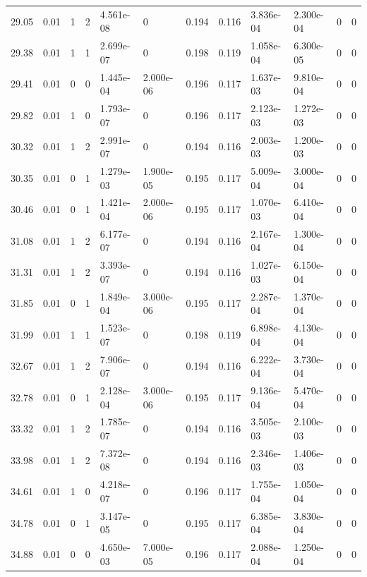 \documentclass[preview]{standalone}
\begin{document}
{{{\begin{tabular}{L{1.2cm}C{1.2cm} C{0.3cm}C{0.5cm} C{1.4cm}C{1.4cm} C{1.4cm}C{1.4cm} C{1.6cm}C{1.6cm} C{1.6cm}C{1.6cm}}
  29.05  &  0.01  & 1     &  2 &  4.561e-08  & 0  &  0.194&   0.116& 3.836e-04 & 2.300e-04   &  0 & 0  \\ 
  29.38  &  0.01  & 1     &  1 &  2.699e-07  & 0  &  0.198&   0.119& 1.058e-04 & 6.300e-05   &  0 & 0  \\ 
  29.41  &  0.01  & 0     &  0 &  1.445e-04  & 2.000e-06  &  0.196&   0.117& 1.637e-03 & 9.810e-04   &  0 & 0  \\ 
  29.82  &  0.01  & 1     &  0 &  1.793e-07  & 0  &  0.196&   0.117& 2.123e-03 & 1.272e-03   &  0 & 0  \\ 
  30.32  &  0.01  & 1     &  2 &  2.991e-07  & 0  &  0.194&   0.116& 2.003e-03 & 1.200e-03   &  0 & 0  \\ 
  30.35  &  0.01  & 0     &  1 &  1.279e-03  & 1.900e-05  &  0.195&   0.117& 5.009e-04 & 3.000e-04   &  0 & 0  \\ 
  30.46  &  0.01  & 0     &  1 &  1.421e-04  & 2.000e-06  &  0.195&   0.117& 1.070e-03 & 6.410e-04   &  0 & 0  \\ 
  31.08  &  0.01  & 1     &  2 &  6.177e-07  & 0  &  0.194&   0.116& 2.167e-04 & 1.300e-04   &  0 & 0  \\ 
  31.31  &  0.01  & 1     &  2 &  3.393e-07  & 0  &  0.194&   0.116& 1.027e-03 & 6.150e-04   &  0 & 0  \\ 
  31.85  &  0.01  & 0     &  1 &  1.849e-04  & 3.000e-06  &  0.195&   0.117& 2.287e-04 & 1.370e-04   &  0 & 0  \\ 
  31.99  &  0.01  & 1     &  1 &  1.523e-07  & 0  &  0.198&   0.119& 6.898e-04 & 4.130e-04   &  0 & 0  \\ 
  32.67  &  0.01  & 1     &  2 &  7.906e-07  & 0  &  0.194&   0.116& 6.222e-04 & 3.730e-04   &  0 & 0  \\ 
  32.78  &  0.01  & 0     &  1 &  2.128e-04  & 3.000e-06  &  0.195&   0.117& 9.136e-04 & 5.470e-04   &  0 & 0  \\ 
  33.32  &  0.01  & 1     &  2 &  1.785e-07  & 0  &  0.194&   0.116& 3.505e-03 & 2.100e-03   &  0 & 0  \\ 
  33.98  &  0.01  & 1     &  2 &  7.372e-08  & 0  &  0.194&   0.116& 2.346e-03 & 1.406e-03   &  0 & 0  \\ 
  34.61  &  0.01  & 1     &  0 &  4.218e-07  & 0  &  0.196&   0.117& 1.755e-04 & 1.050e-04   &  0 & 0  \\ 
  34.78  &  0.01  & 0     &  1 &  3.147e-05  & 0  &  0.195&   0.117& 6.385e-04 & 3.830e-04   &  0 & 0  \\ 
  34.88  &  0.01  & 0     &  0 &  4.650e-03  & 7.000e-05  &  0.196&   0.117& 2.088e-04 & 1.250e-04   &  0 & 0  \\ 

\end{tabular}}}}
\end{document}
